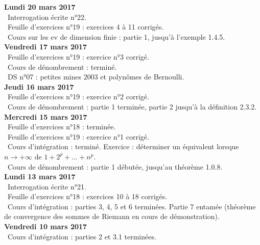 \documentclass[12pt,a4paper]{article}
\begin{document}
\noindent\textbf{Lundi 20 mars 2017}\\
\bu\ Interrogation écrite n°22.\\
\bu\ Feuille d'exercices n°19 : exercices 4 à 11 corrigés.\\
\bu\ Cours sur les ev de dimension finie : partie 1, jusqu'à l'exemple 1.4.5.\vspace{.4cm}\\

\noindent\textbf{Vendredi 17  mars 2017}\\
\bu\ Feuille d'exercices n°19 : exercice n°3 corrigé.\\
\bu\ Cours de dénombrement : terminé.\\
\bu\ DS n°07 : petites mines 2003 et polynômes de Bernoulli.\vspace{.4cm}\\

\noindent\textbf{Jeudi 16  mars 2017}\\
\bu\ Feuille d'exercices n°19 : exercice n°2 corrigé.\\
\bu\ Cours de dénombrement : partie 1 terminée, partie 2 jusqu'à la définition 2.3.2.\vspace{.4cm}\\

\noindent\textbf{Mercredi 15  mars 2017}\\
\bu\ Feuille d'exercices n°18 : terminée.\\
\bu\ Feuille d'exercices n°19 : exercice n°1 corrigé.\\
\bu\ Cours d'intégration : terminé. Exercice : déterminer un équivalent lorsque $n \to +\infty$ de $1+2^p+\dots+n^p$.\\
\bu\ Cours de dénombrement : partie 1 débutée, jusqu'au théorème 1.0.8.\vspace{.4cm}\\

\noindent\textbf{Lundi 13 mars 2017}\\
\bu\ Interrogation écrite n°21.\\
\bu\ Feuille d'exercices n°18 : exercices 10 à 18 corrigés.\\
\bu\ Cours d'intégration : parties 3, 4, 5 et 6 terminées. Partie 7 entamée (théorème de convergence des sommes de Riemann en cours de démonstration).\vspace{.4cm}\\

\noindent\textbf{Vendredi 10 mars 2017}\\
\bu\ Cours d'intégration : parties 2 et 3.1 terminées.\vspace{.4cm}\\
\end{document}
